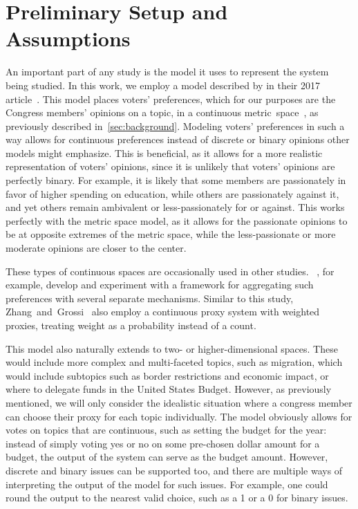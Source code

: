 \section{Preliminary Setup and Assumptions}\label{sec:setup-and-assumptions}
An important part of any study is the model it uses to represent the system being
studied.
In this work, we employ a model described by  in their 2017
article~\cite{Cohensius2017}.
This model places voters' preferences, which for our purposes are the Congress
members' opinions on a topic, in a continuous metric~space~\systemspace, as
previously described in~\autoref{sec:background}.
Modeling voters' preferences in such a way allows for continuous preferences instead of
discrete or binary opinions other models might emphasize.
This is beneficial, as it allows for a more realistic representation of voters'
opinions, since it is unlikely that voters' opinions are perfectly binary.
For example, it is likely that some members are passionately in favor of higher
spending on education, while others are passionately against it, and yet others
remain ambivalent or less-passionately for or against.
This works perfectly with the metric space model, as it allows for the passionate
opinions to be at opposite extremes of the metric space, while the less-passionate or
more moderate opinions are closer to the center.

These types of continuous spaces are occasionally used in other studies.
~\cite{Bulteau2021}, for example, develop and experiment with a framework
for aggregating such preferences with several separate mechanisms.
Similar to this study, Zhang~and~Grossi~\cite{Zhang2022} also employ a continuous
proxy system with weighted proxies, treating weight as a probability instead of a count.

This model also naturally extends to two- or higher-dimensional spaces.
These would include more complex and multi-faceted topics, such as migration, which
would include subtopics such as border restrictions and economic impact, or where to
delegate funds in the United States Budget.
However, as previously mentioned, we will only consider the idealistic situation
where a congress member can choose their proxy for each topic individually.
The model obviously allows for votes on topics that are continuous, such as setting the
budget for the year: instead of simply voting yes or no on some pre-chosen dollar
amount for a budget, the output of the system can serve as the budget amount.
However, discrete and binary issues can be supported too, and there are multiple
ways of interpreting the output of the model for such issues.
For example, one could round the output to the nearest valid choice, such as a 1 or a
0 for binary issues.

